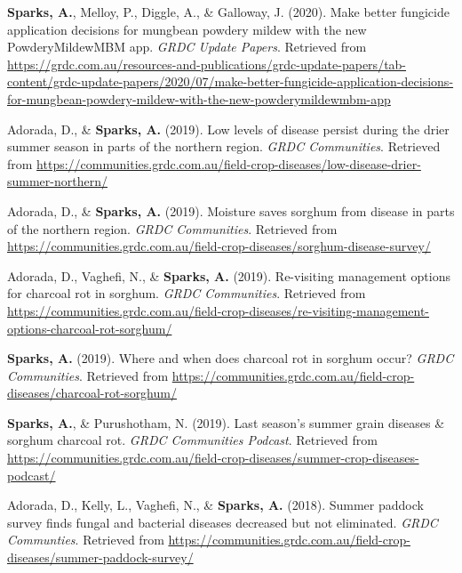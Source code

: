 \documentclass[11pt, a4paper]{awesome-cv}
\begin{document}
\leavevmode{}%
\textbf{Sparks, A.}, Melloy, P., Diggle, A., \& Galloway, J. (2020).
Make better fungicide application decisions for mungbean powdery mildew
with the new {PowderyMildewMBM} app. \emph{{GRDC} Update Papers}.
Retrieved from
\url{https://grdc.com.au/resources-and-publications/grdc-update-papers/tab-content/grdc-update-papers/2020/07/make-better-fungicide-application-decisions-for-mungbean-powdery-mildew-with-the-new-powderymildewmbm-app}

\leavevmode{}%
Adorada, D., \& \textbf{Sparks, A.} (2019). Low levels of disease
persist during the drier summer season in parts of the northern region.
\emph{GRDC Communities}. Retrieved from
\url{https://communities.grdc.com.au/field-crop-diseases/low-disease-drier-summer-northern/}

\leavevmode{}%
Adorada, D., \& \textbf{Sparks, A.} (2019). Moisture saves sorghum from
disease in parts of the northern region. \emph{GRDC Communities}.
Retrieved from
\url{https://communities.grdc.com.au/field-crop-diseases/sorghum-disease-survey/}

\leavevmode{}%
Adorada, D., Vaghefi, N., \& \textbf{Sparks, A.} (2019). Re-visiting
management options for charcoal rot in sorghum. \emph{GRDC Communities}.
Retrieved from
\url{https://communities.grdc.com.au/field-crop-diseases/re-visiting-management-options-charcoal-rot-sorghum/}

\leavevmode{}%
\textbf{Sparks, A.} (2019). Where and when does charcoal rot in sorghum
occur? \emph{GRDC Communities}. Retrieved from
\url{https://communities.grdc.com.au/field-crop-diseases/charcoal-rot-sorghum/}

\leavevmode{}%
\textbf{Sparks, A.}, \& Purushotham, N. (2019). Last season's summer
grain diseases \& sorghum charcoal rot. \emph{GRDC Communities Podcast}.
Retrieved from
\url{https://communities.grdc.com.au/field-crop-diseases/summer-crop-diseases-podcast/}

\leavevmode{}%
Adorada, D., Kelly, L., Vaghefi, N., \& \textbf{Sparks, A.} (2018).
Summer paddock survey finds fungal and bacterial diseases decreased but
not eliminated. \emph{GRDC Communties}. Retrieved from
\url{https://communities.grdc.com.au/field-crop-diseases/summer-paddock-survey/}
\end{document}
